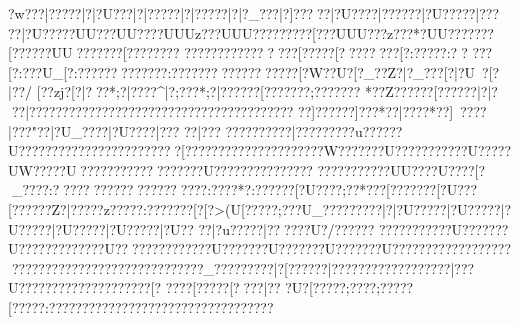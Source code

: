 {{{{{{{{{{{{{{{{{{{{{{{{{{{{{{{{{{{{{{{{{{{{{{{{{{{{{{{{{{{{{{{{{{{{{{{{{{{{{{{{{{{{{{{{{{{{{{{{{{{{{{{{{{{{{{{{{{{{{{{{{{{{{{{{{{{{{{{{{{{{{{{{{{{{{{{{{{{{{{{{{{{{{{{{{{{{{{{{{{{{{{{{{{{{{{{{{{{{{{{{{{{{{{{{{{{{{{{{{{{{{{{{{{{{{{{{{{{{{{{{{{{{{{{{{{{{{{{{{{{{{{{{{{{{{{{{{{{{{{{{{{{{{{{{{{{{{{{{{{{{{{{{{{{{{{{{{{{{{{{{{{{{{{{{{{{{{{{{{{{{{{{{{{{{{{{{{{{{{{{{{{{{{{{{{{{{{{{{{{{{{{{{{{{{{{{{{{{{{{{{{{{{{{{{{{{{{{{{{{{{{{{{{{{{{{{{{{{{{{{{{{{{{{{{{{{{{{{{{{{{{{{{{{{{{{{{{{{{{{{{{{{{{{{{{{{{{{{{{{{{{{{{{}?\?w???|?\?????|?|?U???|?|?????|?|?????|?|?_???|?]??? ??|?U?? ??|???? ??|?U?????|???  ??|?U?????UU? ??UU????UUUz???UUU?????????[???UUU???z?  {??*?UU{?? ?????[???? ?{?UU?{???? ??[?????{???
???{??? ?????{?????[?????[????  {???? [?:?????:??
???[?:???U_[?:?????{????????:????????????{??  ????[?W??U{?[?_??Z?|?_???[?|?U~? [?|??/ [?\??zj?[?|???*;?|????^|?;???* ;?|?????}?[???????;?????\???
*??Z?}?????[?}?????|?|???|?}???????}???????}???????}???????}???????}????
??]???? ??]???* ??|????*??]~??  ??|???" ??|?U_????|?U????|??? 
??|???
 ??????????|?????????u??????U??????????????????{??????[????????? ???????? ????W???????U????????? ??U?????UW?????U?????}?????????????U???????????????
 ???????????UU???{?U????[?_????:????{????? ???????{????  {?:????*{?:?????{?[?U???{?;??*??{?[???????[?U???[??? ???Z?|?????z?\?????:???????[?[?>( U[?\?????;???U_??{???????|?|?U?????|?U?????|?U?????|?U?????|?U?????|?U??
??|?u?????|??????U?/ ??????  ??}?????????U???????U?? ??????? ????U??????????????U???????U???????U???????U??????????????????????????????????????? ????????_?????????|?[?????{?|?????{?\???????\???????|???U???\???????\???????\? ?????[? 
????[?  ????[? ???|?? ?U?[?? ???;?  ???;?  ????[?  ????:?  ????{?? ?????????????? ?????? ??????? 
}}}}}}}}}}}}}}}}}}}}}}}}}}}}}}}}}}}}}}}}}}}}}}}}}}}}}}}}}}}}}}}}}}}}}}}}}}}}}}}}}}}}}}}}}}}}}}}}}}}}}}}}}}}}}}}}}}}}}}}}}}}}}}}}}}}}}}}}}}}}}}}}}}}}}}}}}}}}}}}}}}}}}}}}}}}}}}}}}}}}}}}}}}}}}}}}}}}}}}}}}}}}}}}}}}}}}}}}}}}}}}}}}}}}}}}}}}}}}}}}}}}}}}}}}}}}}}}}}}}}}}}}}}}}}}}}}}}}}}}}}}}}}}}}}}}}}}}}}}}}}}}}}}}}}}}}}}}}}}}}}}}}}}}}}}}}}}}}}}}}}}}}}}}}}}}}}}}}}}}}}}}}}}}}}}}}}}}}}}}}}}}}}}}}}}}}}}}}}}}}}}}}}}}}}}}}}}}}}}}}}}}}}}}}}}}}}}}}}}}}}}}}}}}}}}}}}}}}}}}}}}}}}}}}}}}}}}}}}}}}}}}}}}}}}}}}}}}}}}}}}}}}}}}}}}}}}}}}}
